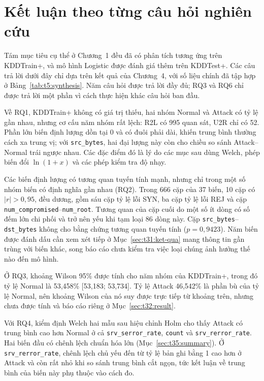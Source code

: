 \documentclass[../main.tex]{subfiles}
\begin{document}
\section{Kết luận theo từng câu hỏi nghiên cứu}
\label{sec:t5:conclusion}

Tám mục tiêu cụ thể ở Chương~1 đều đã có phân tích tương ứng trên KDDTrain+, và mô hình Logistic được đánh giá thêm trên KDDTest+. Các câu trả lời dưới đây chỉ dựa trên kết quả của Chương~4, với số liệu chính đã tập hợp ở Bảng~\ref{tab:t5:synthesis}. Năm câu hỏi được trả lời đầy đủ; RQ3 và RQ6 chỉ được trả lời một phần vì cách thực hiện khác câu hỏi ban đầu.

Về RQ1, KDDTrain+ không có giá trị thiếu, hai nhóm Normal và Attack có tỷ lệ gần nhau, nhưng cơ cấu năm nhóm rất lệch: R2L có 995 quan sát, U2R chỉ có 52. Phần lớn biến định lượng dồn tại 0 và có đuôi phải dài, khiến trung bình thường cách xa trung vị; với \texttt{src\_bytes}, hai đại lượng này còn cho chiều so sánh Attack--Normal trái ngược nhau. Các đặc điểm đó là lý do các mục sau dùng Welch, phép biến đổi $\ln(1+x)$ và các phép kiểm tra độ nhạy.

Các biến định lượng có tương quan tuyến tính mạnh, nhưng chỉ trong một số nhóm biến có định nghĩa gần nhau (RQ2). Trong 666 cặp của 37 biến, 10 cặp có $|r|>0{,}95$, đều dương, gồm sáu cặp tỷ lệ lỗi SYN, ba cặp tỷ lệ lỗi REJ và cặp \texttt{num\_compromised}--\texttt{num\_root}. Tương quan của cặp cuối do một số ít dòng có số đếm lớn chi phối và trở nên yếu khi tạm loại 86 dòng này. Cặp \texttt{src\_bytes}--\texttt{dst\_bytes} không cho bằng chứng tương quan tuyến tính ($p=0{,}9423$). Năm biến được đánh dấu cần xem xét tiếp ở Mục~\ref{sec:t31:ket-qua} mang thông tin gần trùng với biến khác, song báo cáo chưa kiểm tra việc loại chúng ảnh hưởng thế nào đến mô hình.

Ở RQ3, khoảng Wilson 95\% được tính cho năm nhóm của KDDTrain+, trong đó tỷ lệ Normal là 53,458\% [53,183; 53,734]. Tỷ lệ Attack 46,542\% là phần bù của tỷ lệ Normal, nên khoảng Wilson của nó suy được trực tiếp từ khoảng trên, nhưng chưa được tính và báo cáo riêng ở Mục~\ref{sec:t32:result}.

Với RQ4, kiểm định Welch hai mẫu sau hiệu chỉnh Holm cho thấy Attack có trung bình cao hơn Normal ở cả \texttt{srv\_serror\_rate}, \texttt{count} và \texttt{srv\_rerror\_rate}. Hai biến đầu có chênh lệch chuẩn hóa lớn (Mục~\ref{sec:t35:summary}). Ở \texttt{srv\_rerror\_rate}, chênh lệch chủ yếu đến từ tỷ lệ bản ghi bằng 1 cao hơn ở Attack và còn rất nhỏ khi so sánh trung bình cắt ngọn, tức kết luận về trung bình của biến này phụ thuộc vào cách đo.
\end{document}

